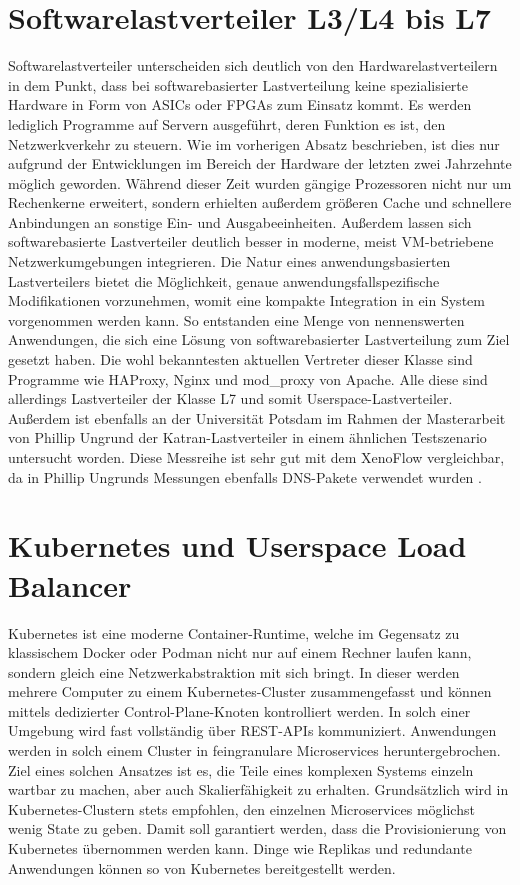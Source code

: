 \section{Softwarelastverteiler L3/L4 bis L7}
Softwarelastverteiler unterscheiden sich deutlich von den Hardwarelastverteilern in dem Punkt, dass bei softwarebasierter Lastverteilung keine spezialisierte Hardware in Form von ASICs oder FPGAs zum Einsatz kommt. Es werden lediglich Programme auf Servern ausgeführt, deren Funktion es ist, den Netzwerkverkehr zu steuern. Wie im vorherigen Absatz beschrieben, ist dies nur aufgrund der Entwicklungen im Bereich der Hardware der letzten zwei Jahrzehnte möglich geworden. Während dieser Zeit wurden gängige Prozessoren nicht nur um Rechenkerne erweitert, sondern erhielten außerdem größeren Cache und schnellere Anbindungen an sonstige Ein- und Ausgabeeinheiten. Außerdem lassen sich softwarebasierte Lastverteiler deutlich besser in moderne, meist VM-betriebene Netzwerkumgebungen integrieren. Die Natur eines anwendungsbasierten Lastverteilers bietet die Möglichkeit, genaue anwendungsfallspezifische Modifikationen vorzunehmen, womit eine kompakte Integration in ein System vorgenommen werden kann. \cite{softwarelb} So entstanden eine Menge von nennenswerten Anwendungen, die sich eine Lösung von softwarebasierter Lastverteilung zum Ziel gesetzt haben. Die wohl bekanntesten aktuellen Vertreter dieser Klasse sind Programme wie HAProxy, Nginx und mod\_proxy von Apache. \cite{soni2016load} Alle diese sind allerdings Lastverteiler der Klasse L7 und somit Userspace-Lastverteiler. Außerdem ist ebenfalls an der Universität Potsdam im Rahmen der Masterarbeit von Phillip Ungrund der Katran-Lastverteiler in einem ähnlichen Testszenario untersucht worden. Diese Messreihe ist sehr gut mit dem XenoFlow vergleichbar, da in Phillip Ungrunds Messungen ebenfalls DNS-Pakete verwendet wurden \cite{ungrund}. 
\section{Kubernetes und Userspace Load Balancer}
Kubernetes ist eine moderne Container-Runtime, welche im Gegensatz zu klassischem Docker oder Podman nicht nur auf einem Rechner laufen kann, sondern gleich eine Netzwerkabstraktion mit sich bringt. In dieser werden mehrere Computer zu einem Kubernetes-Cluster zusammengefasst und können mittels dedizierter Control-Plane-Knoten kontrolliert werden. In solch einer Umgebung wird fast vollständig über REST-APIs kommuniziert. Anwendungen werden in solch einem Cluster in feingranulare Microservices heruntergebrochen. Ziel eines solchen Ansatzes ist es, die Teile eines komplexen Systems einzeln wartbar zu machen, aber auch Skalierfähigkeit zu erhalten. Grundsätzlich wird in Kubernetes-Clustern stets empfohlen, den einzelnen Microservices möglichst wenig State zu geben. Damit soll garantiert werden, dass die Provisionierung von Kubernetes übernommen werden kann. Dinge wie Replikas und redundante Anwendungen können so von Kubernetes bereitgestellt werden. \cite{vasireddy2023kubernetes}

